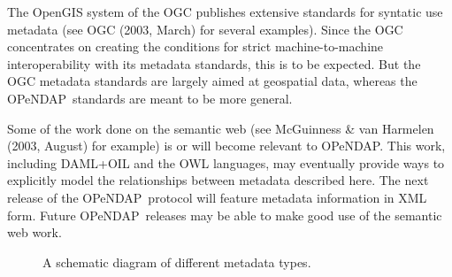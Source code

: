 \documentclass{codata}
\newcommand{\opendap}{\ac{OPeNDAP}}
\begin{document}
The \ac{OpenGIS} system of the \ac{OGC} publishes extensive standards
for syntatic use metadata (see OGC (2003, March) for several examples).
Since the \ac{OGC} concentrates on creating the conditions for strict
machine-to-machine interoperability with its metadata standards, this
is to be expected.  But the \ac{OGC} metadata standards are largely
aimed at geospatial data, whereas the \opendap\ standards are meant to
be more general.

Some of the work done on the semantic web (see McGuinness \& van
Harmelen (2003, August) for example) is or will become relevant to
\opendap.  This work, including DAML+OIL and the OWL languages, may
eventually provide ways to explicitly model the relationships between
metadata described here.  The next release of the \opendap\ protocol
will feature metadata information in XML form.  Future \opendap\ 
releases may be able to make good use of the semantic web work.



\begin{figure}[htb]
  \begin{center}
    \caption{A schematic diagram of different metadata types.}
    \label{fig:metadiagram}
  \end{center}
\end{figure}
\end{document}

